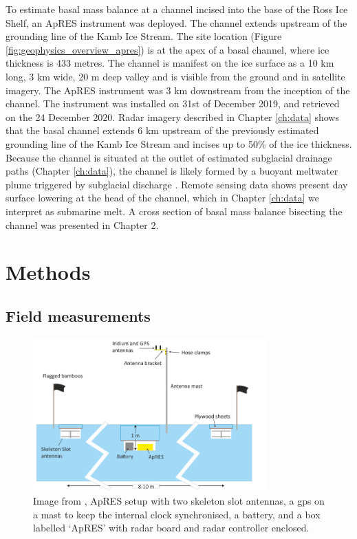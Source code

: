 To estimate basal mass balance at a channel incised into the base of the Ross Ice Shelf, an ApRES instrument was deployed. The channel extends upstream of the grounding line of the Kamb Ice Stream. 
The site location (Figure \ref{fig:geophysics_overview_apres}) is at the apex of a basal channel, where ice thickness is 433 metres. 
The channel is manifest on the ice surface as a 10 km long, 3 km wide, 20 m deep valley and is visible from the ground and in satellite imagery. 
The ApRES instrument was 3 km downstream from the inception of the channel. The instrument was installed on 31st of December 2019, and retrieved on the 24 December 2020. 
Radar imagery described in Chapter \ref{ch:data} shows that the basal channel extends 6 km upstream of the previously estimated grounding line of the Kamb Ice Stream and incises up to 50\% of the ice thickness.  Because the channel is situated at the outlet of estimated subglacial drainage paths (Chapter \ref{ch:data}), the channel is likely formed by a buoyant meltwater plume triggered by subglacial discharge \citep{le2009subglacial,kim2016active}. 
Remote sensing data shows present day surface lowering at the head of the channel, which in Chapter \ref{ch:data} we interpret as submarine melt.  A cross section of basal mass balance bisecting the channel was presented in Chapter 2.


\section{Methods} \label{sec:apres_method}

\subsection{Field measurements}
\begin{figure}[!ht]
\centering
\includegraphics[width=0.8\textwidth]{chapters/3/apres_setup.png}
\caption[ApRES setup]{Image from \cite{nicholls2018apres}, ApRES setup with two skeleton slot antennas, a gps on a mast to keep the internal clock synchronised, a battery, and a box labelled `ApRES' with radar board and radar controller enclosed.}
\label{fig:apres_setup}
\end{figure}

